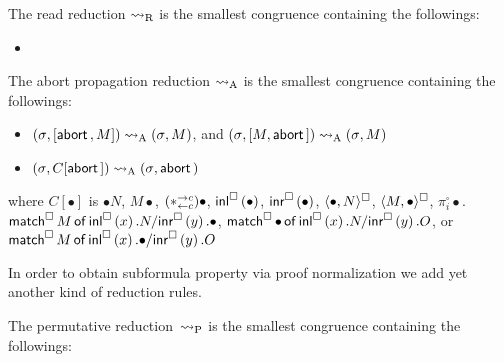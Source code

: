 {\begin{definition}
 \label{read}
 The read reduction $\rreduce$ is the smallest congruence
 containing the
 followings:
\begin{itemize}
 \item {}
\end{itemize}
\end{definition}

\begin{definition}
 The abort propagation reduction $\areduce$ is the smallest
 congruence containing the
 followings:
\begin{itemize}
 \item  $\conf{}{\cotuple{\abort, M}}\areduce
 \conf{}{M}$, and
   $\conf{}{\cotuple{M,\abort}}\areduce
 \conf{}{M}$
 \item  $\conf{}{C[\abort]}\areduce
 \conf{}{\abort}$
\end{itemize}
 where $C[\bullet]$ is
$\bullet N$,
${M \bullet}$,
$(\comod c c)\bullet$,
$\sinl \bullet$,
$\sinr \bullet$,
$\spair {\bullet, N}$,
$\spair {M, \bullet}$,
$\pi^\square_i \bullet$.
$\smat M x N y \bullet$,
$\smat  \bullet x N y O$, or  \\
$\smat  M x \bullet y O$
\end{definition}
In order to obtain subformula property
 via proof normalization
we add yet another kind of reduction rules.
\begin{definition}
 The permutative reduction~$\preduce$ is the smallest congruence
 containing the followings:
\end{definition}}
